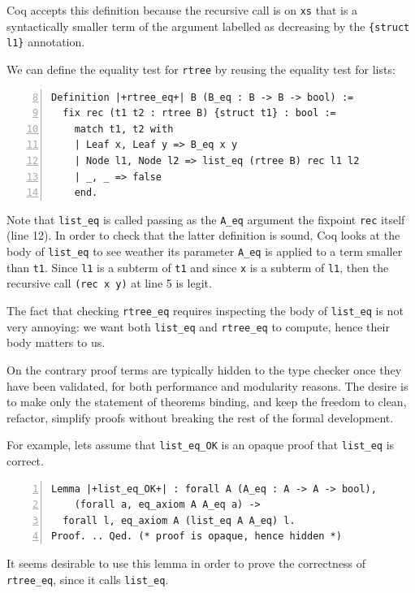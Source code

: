 \documentclass[a4paper,UKenglish,cleveref, autoref]{lipics-v2019}
\begin{document}
\noindent
Coq accepts this definition because
the recursive call is on \lstinline+xs+ that is a syntactically
smaller term of the argument
labelled as decreasing by the \lstinline+{struct l1}+
annotation.

We can define the equality test for \lstinline+rtree+
by reusing the equality test for lists:

\begin{lstlisting}[numbers=left,firstnumber=8]
Definition |+rtree_eq+| B (B_eq : B -> B -> bool) :=
  fix rec (t1 t2 : rtree B) {struct t1} : bool :=
    match t1, t2 with
    | Leaf x, Leaf y => B_eq x y
    | Node l1, Node l2 => list_eq (rtree B) rec l1 l2
    | _, _ => false
    end.
\end{lstlisting}

\noindent
Note that \lstinline+list_eq+ is called passing as the \lstinline+A_eq+
argument the fixpoint \lstinline+rec+ itself (line 12). In order to
check that the latter definition is sound, Coq looks at the body of
\lstinline+list_eq+ to see weather its parameter \lstinline+A_eq+ is
applied to a term smaller than \lstinline+t1+. Since
\lstinline+l1+ is a subterm of \lstinline+t1+ and since \lstinline+x+
is a subterm of \lstinline+l1+, then the recursive call
\lstinline+(rec x y)+ at line 5 is legit.

The fact that checking \lstinline+rtree_eq+ requires
inspecting the body of \lstinline+list_eq+ is not very annoying:
we want both \lstinline+list_eq+
and \lstinline+rtree_eq+ to compute, hence their body matters to us.

On the contrary proof terms are typically hidden to the type checker once
they have been validated, for both performance and modularity reasons.
The desire is to make only the statement of theorems binding, and keep
the freedom to clean, refactor, simplify proofs without breaking
the rest of the formal development. 

For example, lets assume that \lstinline+list_eq_OK+ is an opaque
proof that \lstinline+list_eq+ is correct.

\begin{lstlisting}[numbers=left]
Lemma |+list_eq_OK+| : forall A (A_eq : A -> A -> bool),
    (forall a, eq_axiom A A_eq a) ->
  forall l, eq_axiom A (list_eq A A_eq) l.
Proof. .. Qed. (* proof is opaque, hence hidden *)
\end{lstlisting}

\noindent
It seems desirable to use this lemma in order to prove the
correctness of \lstinline+rtree_eq+, since it calls
\lstinline+list_eq+.
\end{document}
